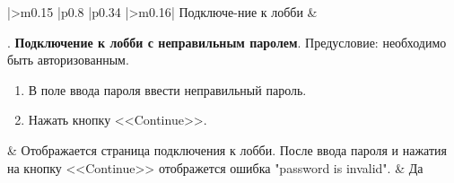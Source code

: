 \begin{landscape}
\begin{longtable}[l]{|>{\centering}m{0.15\textwidth}
					  |p{0.8\textwidth}
					  |p{0.34\textwidth}
					  |>{\centering\arraybackslash}m{0.16\textwidth}|}
	Подключе-ние к лобби &
	\begin{minipage}[t]{1\linewidth}
		\testnumber. \textbf{Подключение к лобби с неправильным паролем}.\newline
 		Предусловие: необходимо быть авторизованным.
 		\begin{enumerate}
 			\item В поле ввода пароля ввести неправильный пароль.
 			\item Нажать кнопку <<Continue>>.
 		\end{enumerate}
 	\end{minipage} &
	Отображается страница подключения к лобби. После ввода пароля и нажатия на кнопку <<Continue>> отображется ошибка "password is invalid". & Да \\
	\hline

	\end{longtable}
\end{landscape}

\renewcommand{\labelenumi}{\asbuk{enumi})}
\renewcommand{\labelenumii}{\arabic{enumii})}